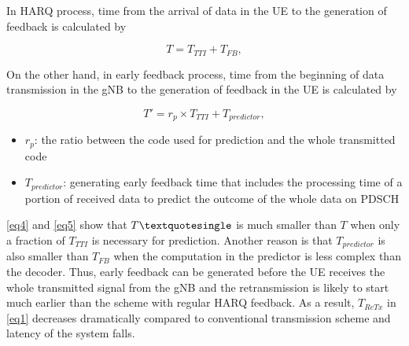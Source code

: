 \documentclass[conference]{IEEEtran}
\begin{document}
In HARQ process, time from the arrival of data in the UE to the generation of feedback is calculated by

\begin{equation}
T = T_{TTI} + T_{FB}\label{eq4},
\end{equation}

On the other hand, in early feedback process, time from the beginning of data transmission in the gNB to the generation of feedback in the UE is calculated by

\begin{equation}
T' = r_{p}\times T_{TTI} + T_{predictor}\label{eq5},
\end{equation}
\begin{itemize}
    \item $r_{p}$: the ratio between the code used for prediction and the whole transmitted code
    \item $T_{predictor}$: generating early feedback time that includes the processing time of a portion of received data to predict the outcome of the whole data on PDSCH
\end{itemize}

\eqref{eq4} and \eqref{eq5} show that $T\textquotesingle$ is much smaller than $T$ when only a fraction of $T_{TTI}$ is necessary for prediction. Another reason is that $T_{predictor}$ is also smaller than $T_{FB}$ when the computation in the predictor is less complex than the decoder. Thus, early feedback can be generated before the UE receives the whole transmitted signal from the gNB and the retransmission is likely to start much earlier than the scheme with regular HARQ feedback. As a result, $T_{ReTx}$ in \eqref{eq1} decreases dramatically compared to conventional transmission scheme and latency of the system falls. 
\end{document}
